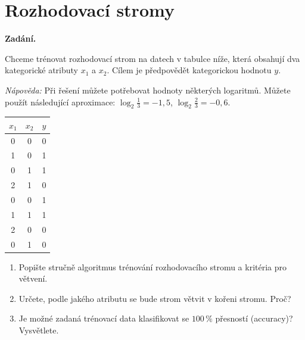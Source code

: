 \section{Rozhodovací stromy}

\noindent\textbf{Zadání.}\par
Chceme trénovat rozhodovací strom na datech v tabulce níže, která obsahují dva kategorické atributy
$x_1$ a $x_2$. Cílem je předpovědět kategorickou hodnotu $y$.

\medskip
\noindent\textit{Nápověda:} Při řešení můžete potřebovat hodnoty některých logaritmů. Můžete použít
následující aproximace: $\log_2 \tfrac{1}{3} = -1{,}5$, $\log_2 \tfrac{2}{3} = -0{,}6$.

\begin{center}
\begin{tabular}{ccc}
\toprule
$x_1$ & $x_2$ & $y$ \\
\midrule
0 & 0 & 0 \\
1 & 0 & 1 \\
0 & 1 & 1 \\
2 & 1 & 0 \\
0 & 0 & 1 \\
1 & 1 & 1 \\
2 & 0 & 0 \\
0 & 1 & 0 \\
\bottomrule
\end{tabular}
\end{center}

\begin{enumerate}
  \item Popište stručně algoritmus trénování rozhodovacího stromu a kritéria pro větvení.
  \item Určete, podle jakého atributu se bude strom větvit v kořeni stromu. Proč?
  \item Je možné zadaná trénovací data klasifikovat se $100\,\%$ přesností (accuracy)? Vysvětlete.
\end{enumerate}

